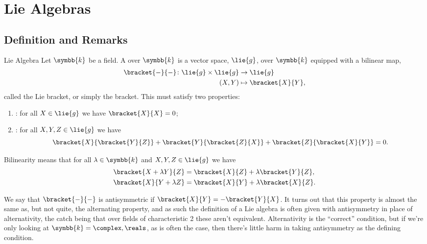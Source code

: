 \documentclass[fleqn]{NotesClass}
\renewcommand{\field}{\symbb{k}}
\begin{document}
    \chapter{Lie Algebras}
    \section{Definition and Remarks}
    \begin{dfn}{Lie Algebra}{}
        Let \(\field\) be a field.
        A  over \(\field\) is a vector space, \(\lie{g}\), over \(\field\) equipped with a bilinear map,
        \begin{align}
            \bracket{-}{-} \colon \lie{g} \times \lie{g} &\to \lie{g}\\
            (X, Y) &\mapsto \bracket{X}{Y},
        \end{align}
        called the Lie bracket, or simply the bracket.
        This must satisfy two properties:
        \begin{enumerate}
            \item {}: for all \(X \in \lie{g}\) we have \(\bracket{X}{X} = 0\);
            \item {}: for all \(X, Y, Z \in \lie{g}\) we have
            \begin{equation}
                \bracket{X}{\bracket{Y}{Z}} + \bracket{Y}{\bracket{Z}{X}} + \bracket{Z}{\bracket{X}{Y}} = 0.
            \end{equation}
        \end{enumerate}
    \end{dfn}
    
    Bilinearity means that for all \(\lambda \in \field\) and \(X, Y, Z \in \lie{g}\) we have
    \begin{align}
        \bracket{X + \lambda Y}{Z} &= \bracket{X}{Z} + \lambda \bracket{Y}{Z},\\
        \bracket{X}{Y + \lambda Z} &= \bracket{X}{Y} + \lambda \bracket{X}{Z}.
    \end{align}
    
    We say that \(\bracket{-}{-}\) is antisymmetric if \(\bracket{X}{Y} = -\bracket{Y}{X}\).
    It turns out that this property is almost the same as, but not quite, the alternating property, and as such the definition of a Lie algebra is often given with antisymmetry in place of alternativity, the catch being that over fields of characteristic 2 these aren't equivalent.
    Alternativity is the \enquote{correct} condition, but if we're only looking at \(\field = \complex, \reals\), as is often the case, then there's little harm in taking antisymmetry as the defining condition.
    
\end{document}
